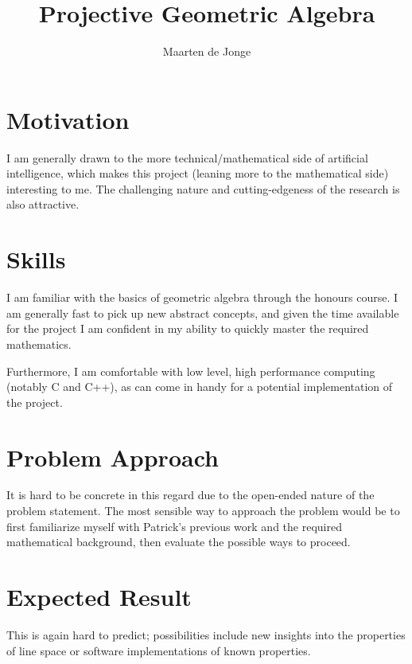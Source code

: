 \documentclass[a4paper, 12pt]{article}
\author{Maarten de Jonge}
\title{Projective Geometric Algebra}
\begin{document}
\maketitle

\section*{Motivation}
I am generally drawn to the more technical/mathematical side of artificial
intelligence, which makes this project (leaning more to the mathematical side)
interesting to me. The challenging nature and cutting-edgeness of the research
is also attractive.

\section*{Skills}
I am familiar with the basics of geometric algebra through the honours course. I
am generally fast to pick up new abstract concepts, and given the time available
for the project I am confident in my ability to quickly master the required
mathematics.

Furthermore, I am comfortable with low level, high performance computing
(notably C and C++), as can come in handy for a potential implementation of
the project.

\section*{Problem Approach}
It is hard to be concrete in this regard due to the open-ended nature of the
problem statement. The most sensible way to approach the problem would be to
first familiarize myself with Patrick's previous work and the required
mathematical background, then evaluate the possible ways to proceed.

\section*{Expected Result}
This is again hard to predict; possibilities include new insights into the
properties of line space or software implementations of known properties.
	
\end{document}
